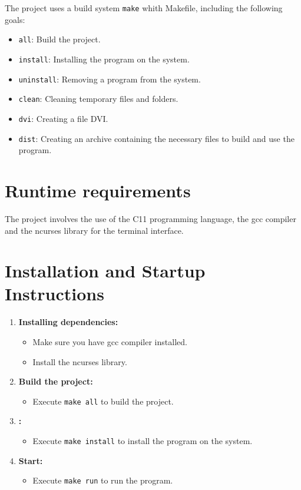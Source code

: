\documentclass{article}
\begin{document}
The project uses a build system \texttt{make} whith Makefile, including the following goals:

\begin{itemize}
    \item \texttt{all}: Build the project.
    \item \texttt{install}: Installing the program on the system.
    \item \texttt{uninstall}: Removing a program from the system.
    \item \texttt{clean}: Cleaning temporary files and folders.
    \item \texttt{dvi}: Creating a file DVI.
    \item \texttt{dist}: Creating an archive containing the necessary files to build and use the program.
\end{itemize}

\section{Runtime requirements}

The project involves the use of the C11 programming language, the gcc compiler and the ncurses library for the terminal interface.

\section{Installation and Startup Instructions}

\begin{enumerate}
    \item \textbf{Installing dependencies:}
        \begin{itemize}
            \item Make sure you have gcc compiler installed.
            \item Install the ncurses library.
        \end{itemize}
    \item \textbf{Build the project:}
        \begin{itemize}
            \item Execute \texttt{make all} to build the project.
        \end{itemize}
    \item \textbf{:}
        \begin{itemize}
            \item Execute \texttt{make install} to install the program on the system.
        \end{itemize}
    \item \textbf{Start:}
        \begin{itemize}
            \item Execute \texttt{make run} to run the program.
        \end{itemize}
\end{enumerate}
\end{document}
